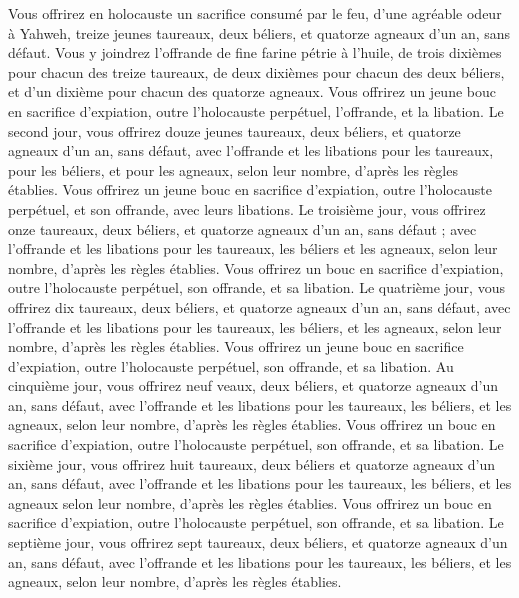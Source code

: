 \begin{multicols}{2}
Vous offrirez en holocauste un sacrifice consumé par le feu, d'une agréable odeur à Yahweh, treize jeunes taureaux, deux béliers, et quatorze agneaux d'un an, sans défaut.
Vous y joindrez l'offrande de fine farine pétrie à l'huile, de trois dixièmes pour chacun des treize taureaux, de deux dixièmes pour chacun des deux béliers,
et d'un dixième pour chacun des quatorze agneaux.
Vous offrirez un jeune bouc en sacrifice d'expiation, outre l'holocauste perpétuel, l'offrande, et la libation.
Le second jour, vous offrirez douze jeunes taureaux, deux béliers, et quatorze agneaux d'un an, sans défaut,
avec l'offrande et les libations pour les taureaux, pour les béliers, et pour les agneaux, selon leur nombre, d'après les règles établies.
Vous offrirez un jeune bouc en sacrifice d'expiation, outre l'holocauste perpétuel, et son offrande, avec leurs libations.
Le troisième jour, vous offrirez onze taureaux, deux béliers, et quatorze agneaux d'un an, sans défaut ;
avec l'offrande et les libations pour les taureaux, les béliers et les agneaux, selon leur nombre, d'après les règles établies.
Vous offrirez un bouc en sacrifice d'expiation, outre l'holocauste perpétuel, son offrande, et sa libation.
Le quatrième jour, vous offrirez dix taureaux, deux béliers, et quatorze agneaux d'un an, sans défaut,
avec l'offrande et les libations pour les taureaux, les béliers, et les agneaux, selon leur nombre, d'après les règles établies.
Vous offrirez un jeune bouc en sacrifice d'expiation, outre l'holocauste perpétuel, son offrande, et sa libation.
Au cinquième jour, vous offrirez neuf veaux, deux béliers, et quatorze agneaux d'un an, sans défaut,
avec l'offrande et les libations pour les taureaux, les béliers, et les agneaux, selon leur nombre, d'après les règles établies.
Vous offrirez un bouc en sacrifice d'expiation, outre l'holocauste perpétuel, son offrande, et sa libation.
Le sixième jour, vous offrirez huit taureaux, deux béliers et quatorze agneaux d'un an, sans défaut,
avec l'offrande et les libations pour les taureaux, les béliers, et les agneaux selon leur nombre, d'après les règles établies.
Vous offrirez un bouc en sacrifice d'expiation, outre l'holocauste perpétuel, son offrande, et sa libation.
Le septième jour, vous offrirez sept taureaux, deux béliers, et quatorze agneaux d'un an, sans défaut,
avec l'offrande et les libations pour les taureaux, les béliers, et les agneaux, selon leur nombre, d'après les règles établies.

\end{multicols}
